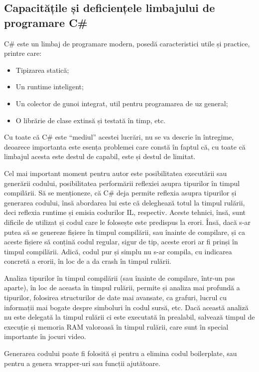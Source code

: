 \documentclass[a4paper,12pt]{report}
\begin{document}
\subsection{Capacitățile și deficiențele limbajului de programare C\#}

{C\# este un limbaj de programare modern, posedă caracteristici utile și practice}\cite{tour_of_csharp}, printre care:
\begin{itemize}
  \item Tipizarea statică;
  \item Un runtime inteligent;
  \item Un colector de gunoi integrat, util pentru programarea de uz general;
  \item O librărie de clase extinsă și testată în timp, etc.
\end{itemize}

Cu toate că C\# este ``mediul'' acestei lucrări, nu se va descrie în întregime,
deoarece importanta este esența problemei care constă în faptul că, cu toate că limbajul acesta este destul de capabil, este și destul de limitat.

Cel mai important moment pentru autor este posibilitatea executării sau generării codului,
posibilitatea performării reflexiei asupra tipurilor în timpul compilării.
Să se menționeze, că C\# deja permite reflexia asupra tipurilor și generarea codului, însă abordarea lui este că deleghează totul la timpul rulării, deci reflexia runtime și emisia codurilor IL, respectiv.
Aceste tehnici, însă, sunt dificile de utilizat și codul care le folosește este predispus la erori.
Însă, dacă s-ar putea să se genereze fișiere în timpul compilării, sau înainte de compilare, și ca aceste fișiere să conțină codul regular, sigur de tip, aceste erori ar fi prinși în timpul compilării.
Adică, codul pur și simplu nu s-ar compila, cu indicarea concretă a erorii, în loc de a da crash în timpul rulării.

Analiza tipurilor în timpul compilării (sau înainte de compilare, într-un pas aparte), în loc de aceasta în timpul rulării, permite și analiza mai profundă a tipurilor, folosirea structurilor de date mai avansate, ca grafuri, lucrul cu informații mai bogate despre simboluri în codul sursă, etc.
Dacă această analiză nu este delegată la timpul rulării ci este executată în prealabil, salvează timpul de execuție și memoria RAM valoroasă în timpul rulării, care sunt în special importante în jocuri video.

Generarea codului poate fi folosită și pentru a elimina codul boilerplate, sau pentru a genera wrapper-uri sau funcții ajutătoare.
\end{document}
